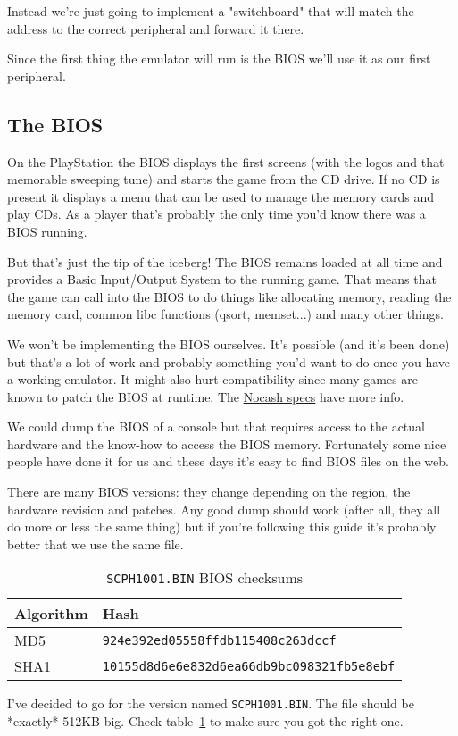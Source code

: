 \documentclass{article}
\begin{document}
Instead we're just going to implement a "switchboard" that will match
the address to the correct peripheral and forward it there.

Since the first thing the emulator will run is the BIOS we'll use it
as our first peripheral.

\subsection{The BIOS}

On the PlayStation the BIOS displays the first screens (with the logos
and that memorable sweeping tune) and starts the game from the CD
drive. If no CD is present it displays a menu that can be used to
manage the memory cards and play CDs. As a player that's probably the
only time you'd know there was a BIOS running.

But that's just the tip of the iceberg! The BIOS remains loaded at all
time and provides a Basic Input/Output System to the running
game. That means that the game can call into the BIOS to do things
like allocating memory, reading the memory card, common libc functions
(qsort, memset...) and many other things.

We won't be implementing the BIOS ourselves. It's possible (and it's
been done) but that's a lot of work and probably something you'd want
to do once you have a working emulator. It might also hurt
compatibility since many games are known to patch the BIOS at
runtime. The
\href{http://problemkaputt.de/psx-spx.htm#biospatches}{Nocash specs}
have more info.

We could dump the BIOS of a console but that requires access to the
actual hardware and the know-how to access the BIOS
memory. Fortunately some nice people have done it for us and these
days it's easy to find BIOS files on the web.

There are many BIOS versions: they change depending on the region, the
hardware revision and patches. Any good dump should work (after all,
they all do more or less the same thing) but if you're following this
guide it's probably better that we use the same file.

\begin{table}[ht]
  \centering

  \begin{tabular}{ l | l }
    Algorithm & Hash \\
    \hline
    MD5    & \texttt{924e392ed05558ffdb115408c263dccf} \\
    SHA1   & \texttt{10155d8d6e6e832d6ea66db9bc098321fb5e8ebf} \\
  \end{tabular}

  \caption{\texttt{SCPH1001.BIN} BIOS checksums}
  \label{tab:checksums}
\end{table}

I've decided to go for the version named \texttt{SCPH1001.BIN}. The file
should be *exactly* 512KB big. Check table~\ref{tab:checksums} to make
sure you got the right one.
\end{document}
